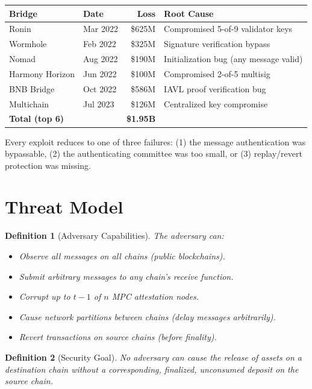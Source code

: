 \documentclass[11pt,a4paper]{article}
\newtheorem{definition}{Definition}[section]
\begin{document}
\begin{center}
\begin{tabular}{llrl}
\toprule
\textbf{Bridge} & \textbf{Date} & \textbf{Loss} & \textbf{Root Cause} \\
\midrule
Ronin & Mar 2022 & \$625M & Compromised 5-of-9 validator keys \\
Wormhole & Feb 2022 & \$325M & Signature verification bypass \\
Nomad & Aug 2022 & \$190M & Initialization bug (any message valid) \\
Harmony Horizon & Jun 2022 & \$100M & Compromised 2-of-5 multisig \\
BNB Bridge & Oct 2022 & \$586M & IAVL proof verification bug \\
Multichain & Jul 2023 & \$126M & Centralized key compromise \\
\midrule
\textbf{Total (top 6)} & & \textbf{\$1.95B} & \\
\bottomrule
\end{tabular}
\end{center}

Every exploit reduces to one of three failures: (1) the message authentication was bypassable, (2) the authenticating committee was too small, or (3) replay/revert protection was missing.

\section{Threat Model}

\begin{definition}[Adversary Capabilities]
The adversary can:
\begin{itemize}[leftmargin=2em]
\item Observe all messages on all chains (public blockchains).
\item Submit arbitrary messages to any chain's receive function.
\item Corrupt up to $t-1$ of $n$ MPC attestation nodes.
\item Cause network partitions between chains (delay messages arbitrarily).
\item Revert transactions on source chains (before finality).
\end{itemize}
\end{definition}

\begin{definition}[Security Goal]
No adversary can cause the release of assets on a destination chain without a corresponding, finalized, unconsumed deposit on the source chain.
\end{definition}
\end{document}
